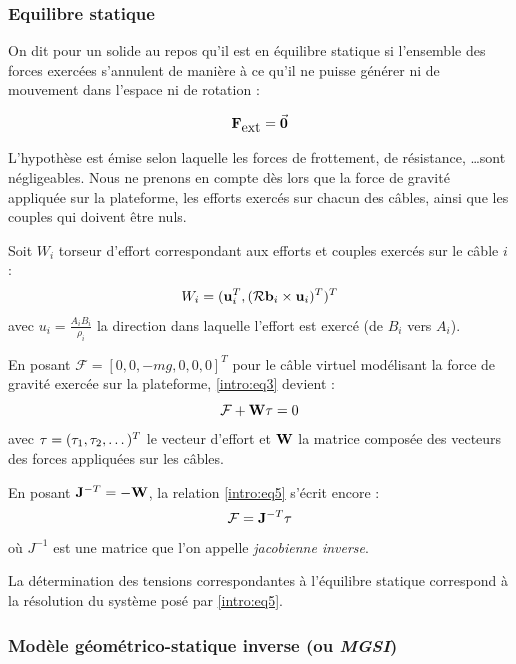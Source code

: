 \subsubsection{Equilibre statique}

On dit pour un solide au repos qu'il est en équilibre statique si l'ensemble des forces exercées s'annulent de manière à ce qu'il ne puisse générer ni de mouvement dans l'espace ni de rotation :

\begin{equation}
\mathcal {\bf F}_{\hbox{ext}} = \vec {\bf 0}
\label{intro:eq2}
\end{equation}

L'hypothèse est émise selon laquelle les forces de frottement, de résistance, \dots sont négligeables. Nous ne prenons en compte dès lors que la force de gravité appliquée sur la plateforme, les efforts exercés sur chacun des câbles, ainsi que les couples qui doivent être nuls.

Soit $W_i$ torseur d'effort correspondant aux efforts et couples exercés sur le câble $i$ :
\begin{equation}
W_i = ({\bf u}_i^T, (\mathcal R {\bf b}_i \times {\bf u}_i)^T)^T
\label{intro:eq3}
\end{equation}
avec $u_i = \frac{A_iB_i}{\rho_i}$ la direction dans laquelle l'effort est exercé (de $B_i$ vers $A_i$).

En posant $\mathcal F = [0, 0, -mg, 0, 0, 0]^T$ pour le câble virtuel modélisant la force de gravité exercée sur la plateforme, \ref{intro:eq3} devient :
\begin{equation}
\mathcal F + {\bf W} {\bf \tau} = 0
\label{intro:eq4}
\end{equation}
avec ${\bf \tau} = (\tau_1, \tau_2, \dots)^T$ le vecteur d'effort et ${\bf W}$ la matrice composée des vecteurs des forces appliquées sur les câbles.

En posant ${\bf J}^{-T} = - {\bf W}$, la relation \ref{intro:eq5} s'écrit encore :
\begin{equation}
\mathcal F = {\bf J}^{-T} {\bf \tau}
\label{intro:eq5}
\end{equation}
où $J^{-1}$ est une matrice que l'on appelle {\it jacobienne inverse}.

La détermination des tensions correspondantes à l'équilibre statique correspond à la résolution du système posé par \ref{intro:eq5}.

\subsubsection{Modèle géométrico-statique inverse (ou {\it MGSI})}

